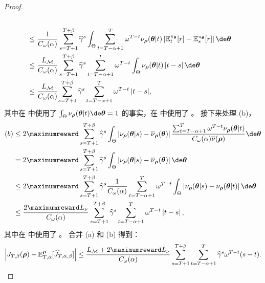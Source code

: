 \begin{proof}
\begin{align}
    \nonumber\\
    & \le \frac{1}{C_\omega(\alpha)}  \sum_{s=T+1}^{T+\beta} \widehat{\gamma}^s \int_{\Theta}  \sum_{t=T-\alpha+1}^T \omega^{T-t} {\nu}_{\boldsymbol\rho}(\boldsymbol\theta|t) \left|\mathbb{E}_t^{\pi_{\boldsymbol\theta}}[r] - \mathbb{E}_s^{\pi_{\boldsymbol\theta}}[r] \right| \de \boldsymbol\theta
    \nonumber\\
    &  \le \frac{L_{\mathcal{M}}}{C_\omega(\alpha)}  \sum_{s=T+1}^{T+\beta} \widehat{\gamma}^s  \sum_{t=T-\alpha+1}^T \omega^{T-t} \int_{\Theta} \nu_{\boldsymbol\rho}(\boldsymbol\theta|t) \left|t-s \right|  \de \boldsymbol\theta
    \label{eq:last_tkt1}\\
    & \le \frac{L_{\mathcal{M}}}{C_\omega(\alpha)}  {\sum_{s=T+1}^{T+\beta} \widehat{\gamma}^s   \sum_{t=T-\alpha+1}^T \omega^{T-t} \left|t-s \right|},
    \label{eq:last_tkt2}
\end{align}
其中在  中使用了 $\textstyle\int_{\Theta} {\nu}_{\boldsymbol\rho}(\boldsymbol\theta|t) \de \boldsymbol\theta = 1$ 的事实，在  中使用了 。
接下来处理 (b)，
\begin{align}
    (b) & \le 2\maximumreward  \sum_{s=T+1}^{T+\beta} \widehat{\gamma}^s \int_{\Theta}  \left|\nu_{\boldsymbol\rho}(\boldsymbol\theta|s) - \overline{\nu}_{\boldsymbol\rho}(\boldsymbol\theta)\right| \frac{\sum_{t=T-\alpha+1}^T \omega^{T-t} \nu_{\boldsymbol\rho}(\boldsymbol\theta|t) }{C_\omega(\alpha) \overline{\nu}(\boldsymbol\rho)} \de \boldsymbol\theta
    \nonumber\\
    & = 2\maximumreward  \sum_{s=T+1}^{T+\beta} \widehat{\gamma}^s \int_{\Theta}  \left|\nu_{\boldsymbol\rho}(\boldsymbol\theta|s) - \overline{\nu}_{\boldsymbol\rho}(\boldsymbol\theta)\right|  \de \boldsymbol\theta
    \nonumber\\
    & \le 2\maximumreward  \sum_{s=T+1}^{T+\beta} \widehat{\gamma}^s  \frac{1}{C_{\omega}(\alpha)} \sum_{t=T-\alpha+1}^{T} \omega^{T-t} \int_{\Theta} \left|\nu_{\boldsymbol\rho}(\boldsymbol\theta|s) - \nu_{\boldsymbol\rho}(\boldsymbol\theta|t) \right|  \de \boldsymbol\theta
    \nonumber\\
    & \le  \frac{2\maximumreward  L_{\nu}}{C_{\omega}(\alpha)} \sum_{s=T+1}^{T+\beta} \widehat{\gamma}^s   \sum_{t=T-\alpha+1}^{T} \omega^{T-t} \left|t - s \right|,
    \label{eq:last_tkt3}
\end{align}
其中在  中使用了 。
合并 (a) 和 (b) 得到：
\begin{align*}
    \left\vert J_{T,\beta}(\boldsymbol\rho) - \mathbb{E}^{\boldsymbol\rho}_{T,\alpha}[\widehat{J}_{T,\alpha,\beta}] \right\vert \le \frac{L_{\mathcal{M}} + 2\maximumreward L_\nu}{C_\omega(\alpha)} \sum_{s=T+1}^{T+\beta} \sum_{t=T-\alpha+1}^{T} \widehat{\gamma}^s    \omega^{T-t} (s-t).

\end{align*}
\end{proof}
